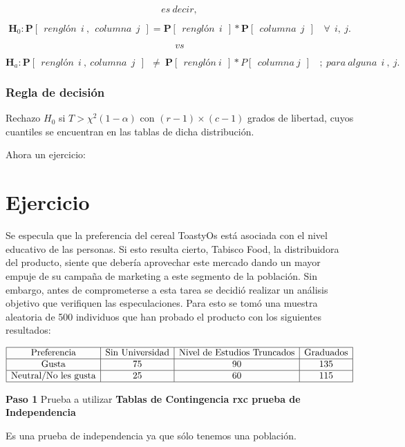 \documentclass[
  a4paper,
  oneside,
  openany]{book}
\begin{document}
\[es \ decir,\]

\[\textbf{H}_0: \mathbf{P}[\ \ renglón\ \ i\ ,\ \ columna\ \ j\ \ ]= \mathbf{P}[\ \ renglón\ \ i \ \ ]*\mathbf{P}[\ \ columna\ \ j\ \ ]\ \ \ \ \forall \  \ i,\ j.\]

\[vs\]

\[\textbf{H}_a:\mathbf{P}[\ \ renglón\ \ i\ ,\ columna\ \ j\ \ ]\ \  \neq \ \mathbf{P}[ \ \ renglón\ i\ \ ]*P[\ \ columna\ j\ \  ]\ \ \ \ ; \ para\ alguna\ \ i \ , \ j. \ \]

\hypertarget{regla-de-decisiuxf3n-24}{%
\subsubsection*{Regla de decisión}\label{regla-de-decisiuxf3n-24}}


Rechazo \(H_0\) si \(T> \chi^2(1-\alpha)\) con \((r-1)\times(c-1)\) grados de libertad, cuyos cuantiles se encuentran en las tablas de dicha distribución.

Ahora un ejercicio:

\hypertarget{ejercicio}{%
\section{Ejercicio}\label{ejercicio}}

Se especula que la preferencia del cereal ToastyOs está asociada con el nivel educativo de las
personas. Si esto resulta cierto, Tabisco Food, la distribuidora del producto, siente que debería
aprovechar este mercado dando un mayor empuje de su campaña de marketing a este segmento
de la población. Sin embargo, antes de comprometerse a esta tarea se decidió realizar un análisis
objetivo que verifiquen las especulaciones. Para esto se tomó una muestra aleatoria de 500
individuos que han probado el producto con los siguientes resultados:

\[
\begin{array}{|c|c|c|c|} 
\hline
\mbox{Preferencia}& \mbox{Sin Universidad}&\mbox{Nivel de Estudios Truncados}&\mbox{Graduados}\\
\hline
\mbox{Gusta}& 75&90&135\\
\hline
\mbox{Neutral/No les gusta}& 25&60&115\\
\hline
\end {array}
\]

\textbf{Paso 1} Prueba a utilizar \textbf{Tablas de Contingencia rxc prueba de Independencia}

Es una prueba de independencia ya que sólo tenemos una población.
\end{document}

